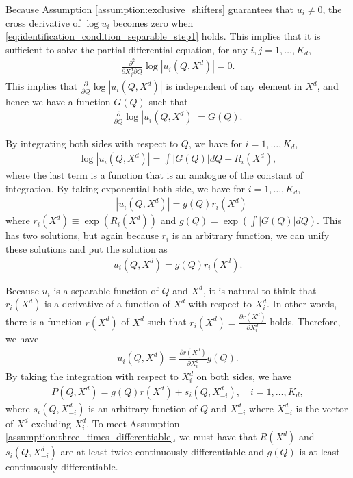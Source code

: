 \documentclass[11pt, a4paper]{article}
\theoremstyle{remark}
\begin{document}
Because Assumption \ref{assumption:exclusive_shifters} guarantees that $u_i \ne 0$, 
the cross derivative of $\log u_i$ becomes zero when \eqref{eq:identification_condition_separable_step1} holds.
This implies that it is sufficient to solve the partial differential equation, for any $i,j = 1, \ldots, K_d$,
\begin{align}
    \frac{\partial^2 }{\partial X^{d}_j \partial Q}\log |u_i(Q,X^{d})| = 0.
\end{align}
This implies that $\frac{\partial }{\partial Q}\log |u_i(Q, X^{d})|$ is independent of any element in $X^{d}$, and hence we have a function $G(Q)$ such that
\begin{align}
    \frac{\partial }{\partial Q}\log |u_i(Q, X^{d})| = G(Q).
\end{align}

By integrating both sides with respect to $Q$, we have for $i = 1, \ldots, K_d$,
\begin{align}
    \log |u_i(Q, X^{d})| = \int |G(Q)| dQ + R_i(X^{d}),
\end{align}
where the last term is a function that is an analogue of the constant of integration.
By taking exponential both side, we have for $i = 1, \ldots, K_d$,
\begin{align}
    & |u_i(Q, X^{d})| = g(Q)r_i(X^{d})
\end{align}
where $r_i(X^{d}) \equiv \exp(R_i(X^{d}))$ and $g(Q) = \exp\left(\int |G(Q)| dQ\right)$.
This has two solutions, but again because $r_i$ is an arbitrary function, we can unify these solutions and put the solution as
\begin{align}
    u_i(Q, X^{d}) = g(Q)r_i(X^{d}).
\end{align}

Because $u_i$ is a separable function of $Q$ and $X^{d}$, it is natural to think that $r_i(X^{d})$ is a derivative of a function of $X^{d}$ with respect to $X^{d}_i$.
In other words, there is a function $r(X^{d})$ of $X^{d}$ such that $r_i(X^{d}) = \frac{\partial r(X^{d})}{\partial X^{d}_i}$ holds.
Therefore, we have
\begin{align}
    u_i(Q, X^{d}) = \frac{\partial r(X^{d})}{\partial X^{d}_i} g(Q).
\end{align}
By taking the integration with respect to $X^{d}_i$ on both sides, we have
\begin{align}
   P(Q, X^{d}) = g(Q) r(X^{d}) + s_i(Q, X^{d}_{-i}), \quad i = 1, \ldots, K_d, \label{eq:inverse_demand_separable_step1}
\end{align}
where $s_i(Q, X^{d}_{-i})$ is an arbitrary function of $Q$ and $X^{d}_{-i}$ where $X^{d}_{-i}$ is the vector of $X^{d}$ excluding $X^{d}_i$.
To meet Assumption \ref{assumption:three_times_differentiable}, we must have that $R(X^{d})$ and $s_i(Q, X^{d}_{-i})$ are at least twice-continuously differentiable and $g(Q)$ is at least continuously differentiable.
\end{document}
